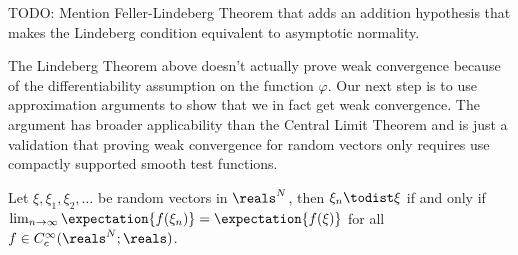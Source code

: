 TODO: Mention Feller-Lindeberg Theorem that adds an addition
hypothesis that makes the Lindeberg condition equivalent to
asymptotic normality.

The Lindeberg Theorem above doesn't actually prove weak convergence
because of the differentiability assumption on the function $\varphi$.
Our next step is to use approximation arguments to show that we in
fact get weak convergence.  The argument has broader applicability
than the Central Limit Theorem and is just a validation that proving weak
convergence for random vectors only requires use compactly supported
smooth test functions.
\begin{lem}\label{WeakConvergenceWithSmoothTestFunctions}Let $\xi, \xi_1, \xi_2, \dots$ be random vectors in $\reals^N$,
  then $\xi_n \todist \xi$ if and only if $\lim_{n \to \infty}
  \expectation{f(\xi_n)} = \expectation{f(\xi)}$ for all $f \in
  C^\infty_c(\reals^N; \reals)$.
\end{lem}

